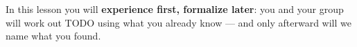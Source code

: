 \documentclass[10pt]{article}
\begin{document}
\vspace{0.14in}

\begin{remindbox}
\small In this lesson you will \textbf{experience first, formalize later}: you and your group
will work out TODO using what you already know --- and only afterward will we name what you
found.
\end{remindbox}
\end{document}
